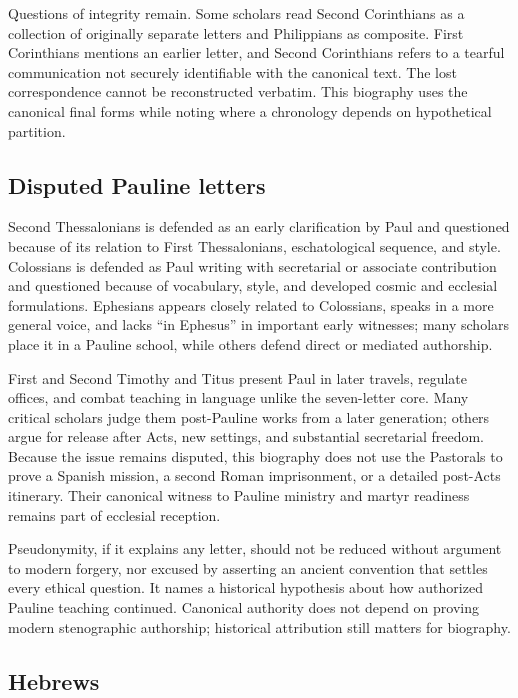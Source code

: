 Questions of integrity remain. Some scholars read Second Corinthians as a
collection of originally separate letters and Philippians as composite. First
Corinthians mentions an earlier letter, and Second Corinthians refers to a
tearful communication not securely identifiable with the canonical text. The
lost correspondence cannot be reconstructed verbatim. This biography uses the
canonical final forms while noting where a chronology depends on hypothetical
partition.

\subsection{Disputed Pauline letters}

Second Thessalonians is defended as an early clarification by Paul and
questioned because of its relation to First Thessalonians, eschatological
sequence, and style. Colossians is defended as Paul writing with secretarial
or associate contribution and questioned because of vocabulary, style, and
developed cosmic and ecclesial formulations. Ephesians appears closely related
to Colossians, speaks in a more general voice, and lacks ``in Ephesus'' in
important early witnesses; many scholars place it in a Pauline school, while
others defend direct or mediated authorship.

First and Second Timothy and Titus present Paul in later travels, regulate
offices, and combat teaching in language unlike the seven-letter core. Many
critical scholars judge them post-Pauline works from a later generation;
others argue for release after Acts, new settings, and substantial secretarial
freedom. Because the issue remains disputed, this biography does not use the
Pastorals to prove a Spanish mission, a second Roman imprisonment, or a
detailed post-Acts itinerary. Their canonical witness to Pauline ministry and
martyr readiness remains part of ecclesial reception.

Pseudonymity, if it explains any letter, should not be reduced without
argument to modern forgery, nor excused by asserting an ancient convention
that settles every ethical question. It names a historical hypothesis about
how authorized Pauline teaching continued. Canonical authority does not depend
on proving modern stenographic authorship; historical attribution still
matters for biography.

\subsection{Hebrews}

